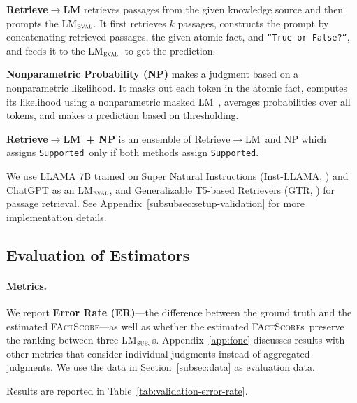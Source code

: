 \documentclass[11pt]{article}
\newcommand{\ours}{\textsc{FActScore}}
\newcommand{\ourScores}{\textsc{FActScore}s}
\newcommand{\subjectLM}{LM$_\textsc{subj}$}
\newcommand{\evalLM}{LM$_\textsc{eval}$}
\newcommand{\sLabel}{\texttt{Supported}}
\newcommand{\nsLabel}{\texttt{Not-supported}}
\newcommand{\rtg}{Retrieve$\rightarrow$LM}
\begin{document}
\vspace{.3em}
\noindent \textbf{\rtg} retrieves passages from the given knowledge source and then prompts the \evalLM. It first retrieves $k$ passages, constructs the prompt by concatenating retrieved passages, the given atomic fact, and \texttt{``True or False?''}, and feeds it to the \evalLM\ to get the prediction.

\vspace{.3em}
\noindent \textbf{Nonparametric Probability (NP)} makes a judgment based on a nonparametric likelihood. 
It masks out each token in the atomic fact, computes its likelihood using a nonparametric masked LM~\citep{min2022nonparametric}, averages probabilities over all tokens, and makes a prediction based on thresholding.

\vspace{.3em}
\noindent \textbf{\rtg\ + NP} is an ensemble of \rtg\ and NP which assigns \sLabel\ only if both methods assign \sLabel. %

\vspace{.3em}
We use LLAMA 7B trained on Super Natural Instructions (Inst-LLAMA, \citealp{touvron2023llama,wang2022super}) and ChatGPT as an \evalLM, and Generalizable T5-based Retrievers (GTR, \citet{ni2021large}) for passage retrieval.
See Appendix~\ref{subsubsec:setup-validation} for more implementation details.

\subsection{Evaluation of Estimators}\label{subsec:models-validation-result}

\paragraph{Metrics.}
We report \textbf{Error Rate (ER)}---the difference between the ground truth and the estimated \ours---as well as whether the estimated \ourScores\ preserve the ranking between three \subjectLM{}s.
Appendix~\ref{app:fone} discusses results with other metrics that consider individual judgments instead of aggregated judgments.
We use the data in Section~\ref{subsec:data} as evaluation data.

\vspace{.3em}
\noindent
Results are reported in Table~\ref{tab:validation-error-rate}.

\vspace{-.3em}
\end{document}
